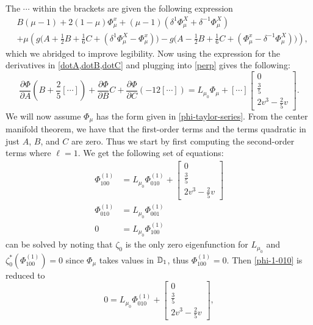 The \(\cdots\) within the brackets are given the following expression
\begin{equation}
\begin{aligned}
	&B (\mu-1) + 2(1-\mu) \Phi_\mu^x + (\mu-1)(\delta^1 \Phi_\mu^X + \delta^{-1} \Phi_\mu^X) \\
	&+  \mu\left( g\big(A + \frac 1 2 B + \frac 1 6 C + (\delta^1 \Phi_\mu^X -\Phi_\mu^x)\big) - g\big(A - \frac 1 2 B + \frac 1 6 C + (\Phi_\mu^x - \delta^{-1} \Phi_\mu^X)\big) \right),
\end{aligned}
\end{equation}
which we abridged to improve legibility. Now using the expression for the derivatives in \cref{dotA,dotB,dotC} and plugging into \cref{perp} gives the following:
\begin{equation}\label{final-eq}
	\frac{\partial\Phi}{\partial A}\left( B + \frac 2 5 [\cdots]\right) + \frac{\partial\Phi}{\partial B}C + \frac{\partial\Phi}{\partial C}\left(-12 [\cdots]\right) = L_{\mu_0} \Phi_\mu + [\cdots] \begin{bmatrix} 0 \\ \frac 35 \\ 2v^3 - \frac 2 5 v \end{bmatrix}.
\end{equation}
We will now assume \(\Phi_\mu\) has the form given in \cref{phi-taylor-series}. From the center manifold theorem, we have that the first-order terms and the terms quadratic in just \(A\), \(B\), and \(C\) are zero. Thus we start by first computing the second-order terms where \(\ell = 1\). We get the following set of equations:
\begin{align}
	\Phi^{(1)}_{100}  & = L_{\mu_0} \Phi^{(1)}_{010} + \begin{bmatrix} 0 \\ \frac 35 \\ 2v^3 - \frac 2 5 v \end{bmatrix} \label{phi-1-010} \\
	\Phi^{(1)}_{010}  & = L_{\mu_0} \Phi^{(1)}_{001}  \label{phi-1-001}\\
	0 & = L_{\mu_0} \Phi^{(1)}_{100} \label{phi-1-100}
\end{align}
 can be solved by noting that \(\zeta_0\) is the only zero eigenfunction for \(L_{\mu_0}\) and \(\zeta_0^*(\Phi_{100}^{(1)}) = 0\) since \(\Phi_\mu\) takes values in \(\mathbb{D}_1\), thus \(\Phi_{100}^{(1)} = 0\). Then \cref{phi-1-010} is reduced to 
\begin{equation}
	0 =  L_{\mu_0} \Phi^{(1)}_{010} + \begin{bmatrix} 0 \\ \frac 35 \\ 2v^3 - \frac 2 5 v \end{bmatrix},
\end{equation}
